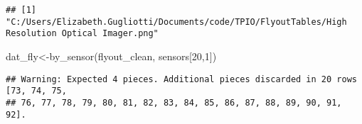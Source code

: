 \documentclass[
]{article}
\newenvironment{Shaded}{\begin{snugshade}}{\end{snugshade}}
\newcommand{\DecValTok}[1]{\textcolor[rgb]{0.00,0.00,0.81}{#1}}
\newcommand{\FunctionTok}[1]{\textcolor[rgb]{0.00,0.00,0.00}{#1}}
\newcommand{\NormalTok}[1]{#1}
\newcommand{\OtherTok}[1]{\textcolor[rgb]{0.56,0.35,0.01}{#1}}
\begin{document}
\begin{verbatim}
## [1] "C:/Users/Elizabeth.Gugliotti/Documents/code/TPIO/FlyoutTables/High Resolution Optical Imager.png"
\end{verbatim}

\begin{Shaded}
\begin{Highlighting}[]
\NormalTok{dat\_fly}\OtherTok{\textless{}{-}}\FunctionTok{by\_sensor}\NormalTok{(flyout\_clean, sensors[}\DecValTok{20}\NormalTok{,}\DecValTok{1}\NormalTok{])}
\end{Highlighting}
\end{Shaded}

\begin{verbatim}
## Warning: Expected 4 pieces. Additional pieces discarded in 20 rows [73, 74, 75,
## 76, 77, 78, 79, 80, 81, 82, 83, 84, 85, 86, 87, 88, 89, 90, 91, 92].
\end{verbatim}
\end{document}
